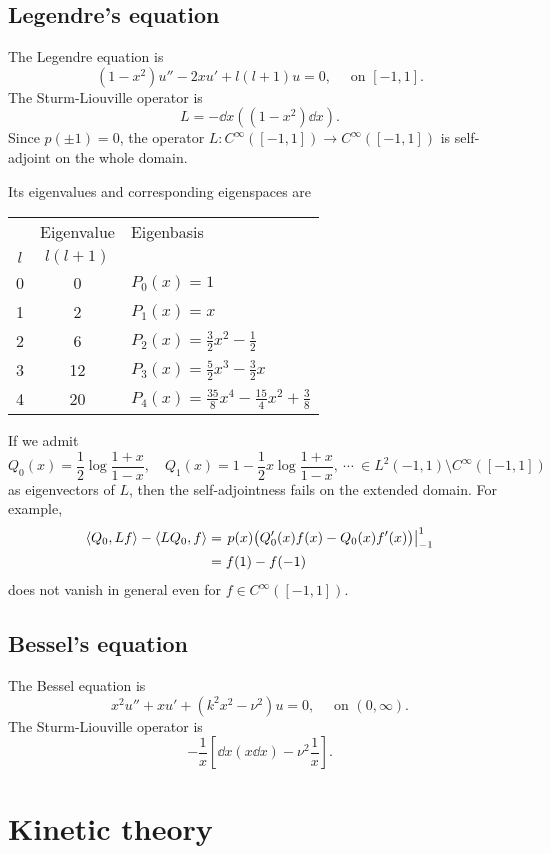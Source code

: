\documentclass[11pt]{article}
\let\realsection\section
\renewcommand\section{\newpage\realsection}
\begin{document}
\subsection{Legendre's equation}
The Legendre equation is
\[(1-x^2)u''-2xu'+l(l+1)u=0,\quad\text{ on }[-1,1].\]
The Sturm-Liouville operator is
\[L=-\dd{x}\left((1-x^2)\dd{x}\right).\]
Since $p(\pm1)=0$, the operator $L:C^\infty([-1,1])\to C^\infty([-1,1])$ is self-adjoint on the whole domain.


Its eigenvalues and corresponding eigenspaces are
\begin{center}\renewcommand{\arraystretch}{1.2}
\begin{tabular}{c|c|l}
\hline
    & Eigenvalue & Eigenbasis \\
$l$ & $l(l+1)$   & \\
\hline
0   & 0          & $P_0(x)=1$ \\
1   & 2          & $P_1(x)=x$ \\
2   & 6          & $P_2(x)=\frac32x^2-\frac12$ \\
3   & 12         & $P_3(x)=\frac52x^3-\frac32x$ \\
4   & 20         & $P_4(x)=\frac{35}8x^4-\frac{15}4x^2+\frac38$\\
\hline
\end{tabular}
\end{center}
If we admit
\[Q_0(x)=\frac12\log\frac{1+x}{1-x},\quad Q_1(x)=1-\frac12x\log\frac{1+x}{1-x},\ \cdots\ \in L^2(-1,1)\setminus C^\infty([-1,1])\]
as eigenvectors of $L$, then the self-adjointness fails on the extended domain.
For example,
\begin{align*}
\langle Q_0,Lf\rangle-\langle LQ_0,f\rangle
&=\left.p(x)\bigl(Q_0'(x)f(x)-Q_0(x)f'(x)\bigr)\right|_{-1}^1\\
&=f(1)-f(-1)
\end{align*}
does not vanish in general even for $f\in C^\infty([-1,1])$.

\subsection{Bessel's equation}
The Bessel equation is
\[x^2u''+xu'+(k^2x^2-\nu^2)u=0,\quad\text{ on }(0,\infty).\]
The Sturm-Liouville operator is
\[-\frac1x\left[\dd{x}\left(x\dd{x}\right)-\nu^2\frac1x\right].\]





\section{Kinetic theory}
\end{document}
